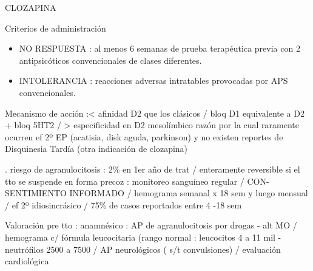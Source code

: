 \faPills CLOZAPINA

Criterios de administración
\begin{itemize}
    \item NO RESPUESTA : al menos 6 semanas de prueba terapéutica previa con 2 antipsicóticos convencionales de clases diferentes.
    \item INTOLERANCIA : reacciones adversas intratables provocadas por APS convencionales.
\end{itemize}
Mecanismo de acción :< afinidad D2 que los clásicos / bloq D1 equivalente a D2 + bloq 5HT2 / > especificidad en D2 mesolímbico razón por la cual raramente ocurren ef 2º EP (acatisia, disk aguda, parkinson) y no existen reportes de Disquinesia Tardía (otra indicación de clozapina)

. riesgo de agranulocitosis : 2\% en 1er año de trat / enteramente reversible si el tto se suspende en forma precoz : monitoreo sanguíneo regular / CON-SENTIMIENTO INFORMADO / hemograma semanal x 18 sem y luego mensual / ef 2º idiosincrásico / 75\% de casos reportados entre 4 -18 sem

Valoración pre tto : anamnésico : AP de agranulocitosis por drogas - alt MO / hemograma c/ fórmula leucocitaria (rango normal : leucocitos 4 a 11 mil - neutrófilos 2500 a 7500 / AP neurológicos ( s/t convulsiones) / evaluación cardiológica

